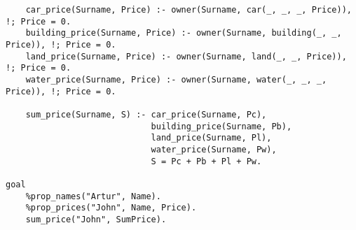 \begin{lstlisting}
    car_price(Surname, Price) :- owner(Surname, car(_, _, _, Price)), !; Price = 0.
    building_price(Surname, Price) :- owner(Surname, building(_, _, Price)), !; Price = 0.
    land_price(Surname, Price) :- owner(Surname, land(_, _, Price)), !; Price = 0.
    water_price(Surname, Price) :- owner(Surname, water(_, _, _, Price)), !; Price = 0.
 				  
    sum_price(Surname, S) :- car_price(Surname, Pc),
    				         building_price(Surname, Pb),
    				         land_price(Surname, Pl),
    				         water_price(Surname, Pw),
    				         S = Pc + Pb + Pl + Pw.
 
goal
    %prop_names("Artur", Name).
    %prop_prices("John", Name, Price).
    sum_price("John", SumPrice).
\end{lstlisting}

